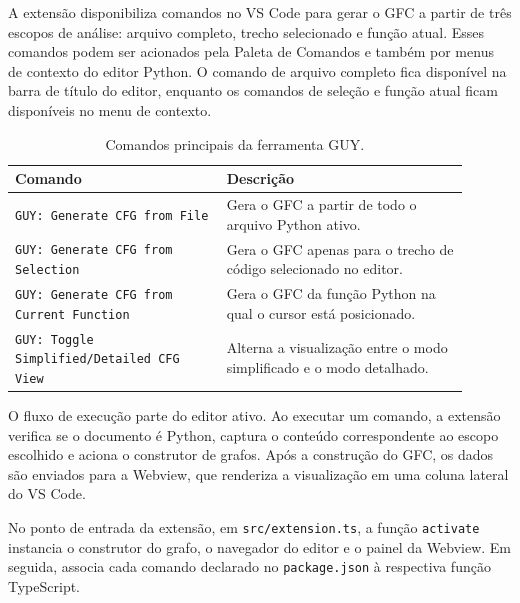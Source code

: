 A extensão disponibiliza comandos no VS Code para gerar o GFC a partir de três escopos de análise: arquivo completo, trecho selecionado e função atual. Esses comandos podem ser acionados pela Paleta de Comandos e também por menus de contexto do editor Python. O comando de arquivo completo fica disponível na barra de título do editor, enquanto os comandos de seleção e função atual ficam disponíveis no menu de contexto.

\begin{table}[H]
    \centering
    \caption{Comandos principais da ferramenta GUY.}
    \begin{tabular}{p{0.42\linewidth} | p{0.48\linewidth}}
        \hline
        \textbf{Comando} & \textbf{Descrição} \\ \hline
        \texttt{GUY: Generate CFG from File} & Gera o GFC a partir de todo o arquivo Python ativo. \\ \hline
        \texttt{GUY: Generate CFG from Selection} & Gera o GFC apenas para o trecho de código selecionado no editor. \\ \hline
        \texttt{GUY: Generate CFG from Current Function} & Gera o GFC da função Python na qual o cursor está posicionado. \\ \hline
        \texttt{GUY: Toggle Simplified/Detailed CFG View} & Alterna a visualização entre o modo simplificado e o modo detalhado. \\ \hline
    \end{tabular}
    \label{tab:comandos_guy}
\end{table}

O fluxo de execução parte do editor ativo. Ao executar um comando, a extensão verifica se o documento é Python, captura o conteúdo correspondente ao escopo escolhido e aciona o construtor de grafos. Após a construção do GFC, os dados são enviados para a Webview, que renderiza a visualização em uma coluna lateral do VS Code.

No ponto de entrada da extensão, em \texttt{src/extension.ts}, a função \texttt{activate} instancia o construtor do grafo, o navegador do editor e o painel da Webview. Em seguida, associa cada comando declarado no \texttt{package.json} à respectiva função TypeScript.


